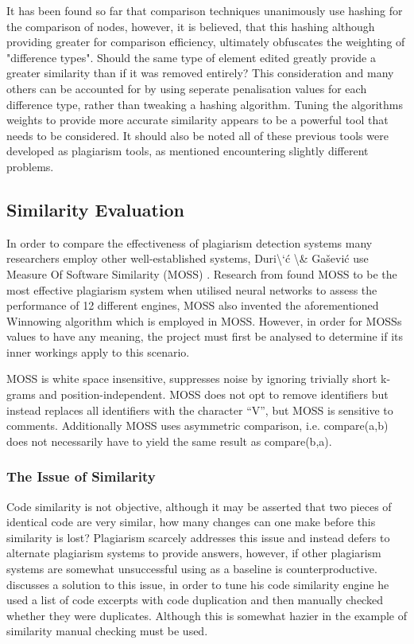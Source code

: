 \documentclass[jou,apacite]{apa6}
\begin{document}
It has been found so far that comparison techniques unanimously use hashing for the comparison of nodes, however, it is believed, that this hashing although providing greater for comparison efficiency, ultimately obfuscates the weighting of "difference types". Should the same type of element edited greatly provide a greater similarity than if it was removed entirely? This consideration and many others can be accounted for by using seperate penalisation values for each difference type, rather than tweaking a hashing algorithm. Tuning the algorithms weights to provide more accurate similarity appears to be a powerful tool that needs to be considered. It should also be noted all of these previous tools were developed as plagiarism tools, as mentioned encountering slightly different problems. 
\subsection{Similarity Evaluation}

In order to compare the effectiveness of plagiarism detection systems many researchers employ other well-established systems, Duri\textbackslash{}`\'{c} \textbackslash{}\& Ga\v{s}evi\'{c} use Measure Of Software Similarity (MOSS) \cite{aiken_1994}. Research from \cite{Engels2007} found MOSS to be the most effective plagiarism system when utilised neural networks to assess the performance of 12 different engines, MOSS also invented the aforementioned Winnowing algorithm \cite{Schleimer2003} which is employed in MOSS. However, in order for MOSS\textquotesingle s values to have any meaning, the project must first be analysed to determine if it\textquotesingle s inner workings apply to this scenario.

MOSS is white space insensitive, suppresses noise by ignoring trivially short k-grams and position-independent. MOSS does not opt to remove identifiers but instead replaces all identifiers with the character \textquotedblleft{}V\textquotedblright{}, but MOSS is sensitive to comments. Additionally MOSS uses asymmetric comparison, i.e. compare(a,b) does not necessarily have to yield the same result as compare(b,a). 

\subsubsection{The Issue of Similarity}
Code similarity is not objective, although it may be asserted that two pieces of identical code are very similar, how many changes can one make before this similarity is lost? Plagiarism scarcely addresses this issue and instead defers to alternate plagiarism systems to provide answers, however, if other plagiarism systems are somewhat unsuccessful using as  a baseline is counterproductive. \cite{Krinke2002} discusses a solution to this issue, in order to tune his code similarity engine he used a list of code excerpts with code duplication and then manually checked whether they were duplicates. Although this is somewhat hazier in the example of similarity manual checking must be used.
\end{document}
